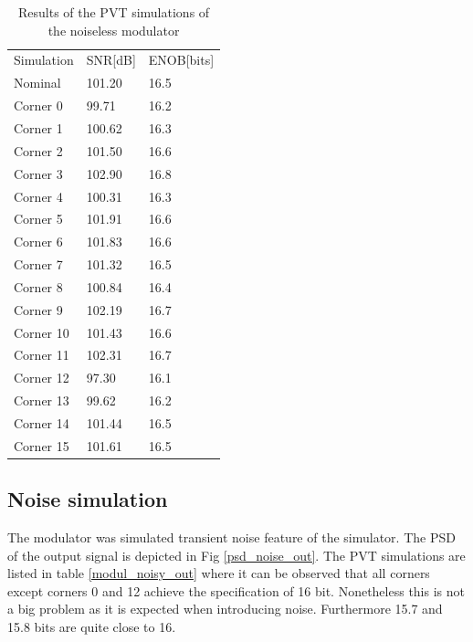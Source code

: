 \begin{table}[H]
\centering

\caption{Results of the PVT simulations of the noiseless modulator}
\label{modul_noiseless_out}
\begin{tabular}{l|l|l}
\hline
\multirow{1}{*}{Simulation} & \multicolumn{1}{c|}{SNR[dB]} & \multicolumn{1}{c}{ENOB[bits]} \\\cline{1-3}
                       
            Nominal       & 101.20 & 16.5\\
            Corner 0      & 99.71 & 16.2\\
            Corner 1      & 100.62 & 16.3\\
            Corner 2      & 101.50 & 16.6\\
            Corner 3     & 102.90 & 16.8\\
            Corner 4     & 100.31 & 16.3\\
            Corner 5      & 101.91 & 16.6\\
            Corner 6      & 101.83 & 16.6\\
            Corner 7      & 101.32 & 16.5\\
            Corner 8      & 100.84 & 16.4\\
            Corner 9      & 102.19 & 16.7\\
            Corner 10      & 101.43 & 16.6\\
            Corner 11      & 102.31 & 16.7\\
            Corner 12      & 97.30 & 16.1\\
            Corner 13      & 99.62 & 16.2\\
            Corner 14      & 101.44 & 16.5\\
            Corner 15      & 101.61 & 16.5\\
            
\hline            
\end{tabular}
\end{table}

\subsection{Noise simulation}
The modulator was simulated transient noise feature of the simulator. The PSD of the output signal is depicted in Fig \ref{psd_noise_out}. The PVT simulations are listed in table \ref{modul_noisy_out} where it can be observed that all corners except corners 0 and 12 achieve the specification of 16 bit. Nonetheless this is not a big problem as it is expected when introducing noise. Furthermore 15.7 and 15.8 bits are quite close to 16. 

